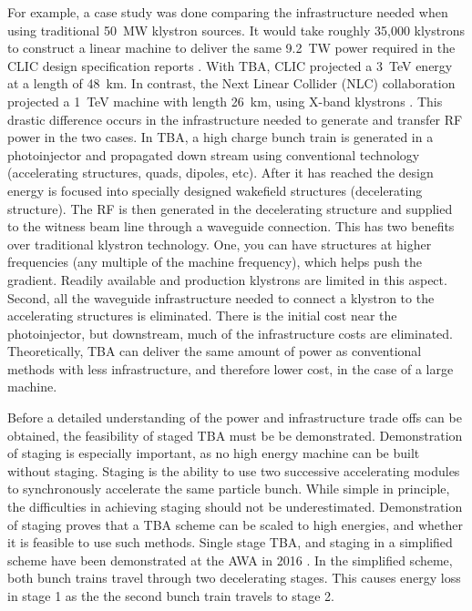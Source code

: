 For example, a case study was done comparing the infrastructure 
needed when using traditional \SI{50}{MW} klystron sources.
It would take roughly 35,000 klystrons to construct a linear machine to deliver the same 
\SI{9.2}{TW} power required in the CLIC design specification reports \cite{CLICdesignReport}. 
With TBA, CLIC projected a \SI{3}{TeV} energy at a length of \SI{48}{km}.
In contrast, the Next Linear Collider (NLC) collaboration projected a \SI{1}{TeV} machine 
with length \SI{26}{km}, using X-band klystrons \cite{NLC}. 
This drastic difference occurs in the infrastructure needed to generate and transfer
RF power in the two cases. In TBA, a high charge bunch train is generated in 
a photoinjector and propagated down stream using conventional technology 
(accelerating structures, quads, dipoles, etc). After it has reached the design energy
is focused into specially designed wakefield structures (decelerating structure).
The RF is then generated in the decelerating structure and supplied to the witness 
beam line through a waveguide connection. This has two benefits over traditional klystron technology.
One, you can have structures at higher frequencies (any multiple of the machine frequency), 
which helps push the gradient. Readily available and production klystrons are limited in this aspect.
Second, all the waveguide infrastructure needed to connect a klystron to the accelerating 
structures is eliminated. There is the initial cost near the photoinjector, 
but downstream, much of the infrastructure costs are eliminated.
Theoretically, TBA can deliver the same amount of power as conventional methods with less 
infrastructure, and therefore lower cost, in the case of a large machine. 

Before a detailed understanding of the power and infrastructure trade offs 
can be obtained, the feasibility of staged TBA must be be demonstrated.
Demonstration of staging is especially important, 
as no high energy machine can be built without staging.
Staging is the ability to use two successive accelerating modules to synchronously accelerate 
the same particle bunch. While simple in principle, the difficulties 
in achieving staging should not be underestimated. 
Demonstration of staging proves that a TBA scheme can be scaled to high energies, and whether it is 
feasible to use such methods. Single stage TBA, and staging 
in a simplified scheme have been demonstrated at the AWA in 2016 \cite{tba2017}.
In the simplified scheme, both bunch trains travel through two decelerating stages.
This causes energy loss in stage 1 as the the second bunch train travels to stage 2.

